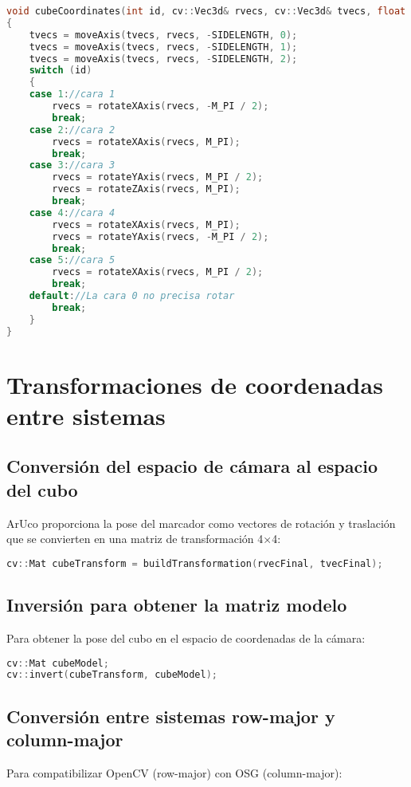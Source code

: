 \begin{lstlisting}[language=C++]
void cubeCoordinates(int id, cv::Vec3d& rvecs, cv::Vec3d& tvecs, float sideLength)
{
    tvecs = moveAxis(tvecs, rvecs, -SIDELENGTH, 0);
    tvecs = moveAxis(tvecs, rvecs, -SIDELENGTH, 1);
    tvecs = moveAxis(tvecs, rvecs, -SIDELENGTH, 2);
    switch (id)
    {
    case 1://cara 1
        rvecs = rotateXAxis(rvecs, -M_PI / 2);
        break;
    case 2://cara 2
        rvecs = rotateXAxis(rvecs, M_PI);
        break;
    case 3://cara 3
        rvecs = rotateYAxis(rvecs, M_PI / 2);
        rvecs = rotateZAxis(rvecs, M_PI);
        break;
    case 4://cara 4
        rvecs = rotateXAxis(rvecs, M_PI);
        rvecs = rotateYAxis(rvecs, -M_PI / 2);
        break;
    case 5://cara 5
        rvecs = rotateXAxis(rvecs, M_PI / 2);
        break;
    default://La cara 0 no precisa rotar
        break;
    }
}
\end{lstlisting}

\section{Transformaciones de coordenadas entre sistemas}

\subsection{Conversión del espacio de cámara al espacio del cubo}
ArUco proporciona la pose del marcador como vectores de rotación y traslación que se convierten en una matriz de transformación 4×4:

\begin{lstlisting}[language=C++]
cv::Mat cubeTransform = buildTransformation(rvecFinal, tvecFinal);
\end{lstlisting}

\subsection{Inversión para obtener la matriz modelo}
Para obtener la pose del cubo en el espacio de coordenadas de la cámara:

\begin{lstlisting}[language=C++]
cv::Mat cubeModel;
cv::invert(cubeTransform, cubeModel);
\end{lstlisting}

\subsection{Conversión entre sistemas row-major y column-major}
Para compatibilizar OpenCV (row-major) con OSG (column-major):

